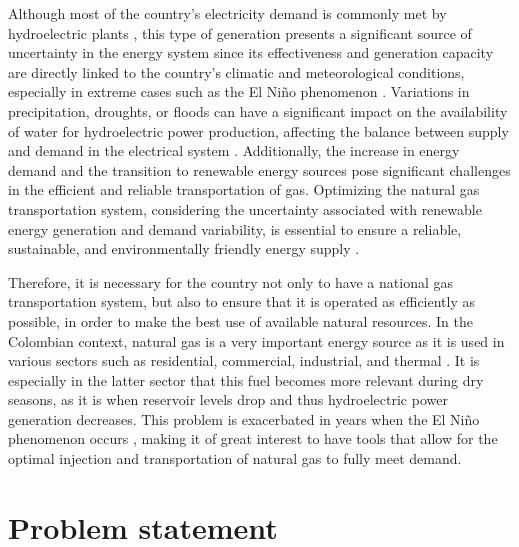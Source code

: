 Although most of the country's electricity demand is commonly met by hydroelectric plants \cite{Arango-Aramburo_Turner_Daenzer_Ríos-Ocampo_Hejazi_Kober_Álvarez-Espinosa_Romero-Otalora_vanderZwaan_2019}, this type of generation presents a significant source of uncertainty in the energy system since its effectiveness and generation capacity are directly linked to the country's climatic and meteorological conditions, especially in extreme cases such as the El Niño phenomenon \cite{Villa-Loaiza_Taype-Huaman_Benavides-Franco_Buenaventura-Vera_Carabalí-Mosquera_2023}. Variations in precipitation, droughts, or floods can have a significant impact on the availability of water for hydroelectric power production, affecting the balance between supply and demand in the electrical system \cite{Ignacio_Fariza_2022}. Additionally, the increase in energy demand and the transition to renewable energy sources pose significant challenges in the efficient and reliable transportation of gas. Optimizing the natural gas transportation system, considering the uncertainty associated with renewable energy generation and demand variability, is essential to ensure a reliable, sustainable, and environmentally friendly energy supply \cite{Shan_Yu_Gong_Huang_Wen_Wang_Ren_Wang_Shi_Liu_2023}.




Therefore, it is necessary for the country not only to have a national gas transportation system, but also to ensure that it is operated as efficiently as possible, in order to make the best use of available natural resources. In the Colombian context, natural gas is a very important energy source as it is used in various sectors such as residential, commercial, industrial, and thermal \cite{Restrepo-Trujillo_Moreno-Chuquen_Jiménez-García_Flores_Chamorro_2022}. It is especially in the latter sector that this fuel becomes more relevant during dry seasons, as it is when reservoir levels drop and thus hydroelectric power generation decreases. This problem is exacerbated in years when the El Niño phenomenon occurs \cite{paper-col}, making it of great interest to have tools that allow for the optimal injection and transportation of natural gas to fully meet demand.

    




\section{Problem statement}

